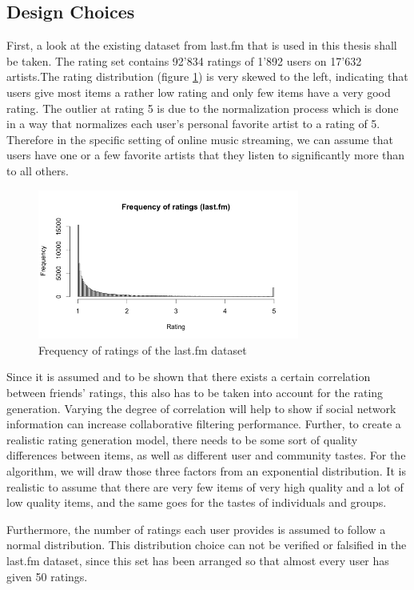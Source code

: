 \subsection{Design Choices}
\label{sst:designchoices} First, a look at the existing dataset from last.fm that is used in this thesis shall be taken. The rating set contains 92'834 ratings of 1'892 users on 17'632 artists.The rating distribution (figure \ref{f:frequencyofratings}) is very skewed to the left, indicating that users give most items a rather low rating and only few items have a very good rating. The outlier at rating 5 is due to the normalization process which is done in a way that normalizes each user's personal favorite artist to a rating of 5. Therefore in the specific setting of online music streaming, we can assume that users have one or a few favorite artists that they listen to significantly more than to all others.

\begin{figure}[!ht]
\centering
\includegraphics[width=325px]{./3-artificialdata/figures/FrequencyOfRatings_Lastfm.png}
\caption{Frequency of ratings of the last.fm dataset}
\label{f:frequencyofratings}
\end{figure}

Since it is assumed and to be shown that there exists a certain correlation between friends' ratings, this also has to be taken into account for the rating generation. Varying the degree of correlation will help to show if social network information can increase collaborative filtering performance. Further, to create a realistic rating generation model, there needs to be some sort of quality differences between items, as well as different user and community tastes. For the algorithm, we will draw those three factors from an exponential distribution. It is realistic to assume that there are very few items of very high quality and a lot of low quality items, and the same goes for the tastes of individuals and groups.

Furthermore, the number of ratings each user provides is assumed to follow a normal distribution. This distribution choice can not be verified or falsified in the last.fm dataset, since this set has been arranged so that almost every user has given 50 ratings.

